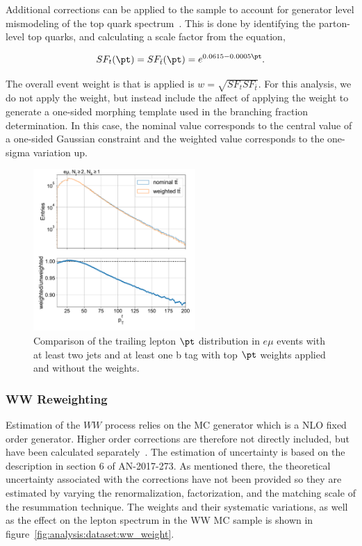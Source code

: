 Additional corrections can be applied to the \ttbar sample to account for generator level mismodeling of the top quark \pt spectrum~\cite{CMS-PAS-TOP-16-011, CMS-PAS-TOP-16-008}.  This is done by identifying the parton-level top quarks, and calculating a scale factor from the equation,

\begin{equation}
    \nonumber
    SF_{t}(\pt) = SF_{\bar{t}}(\pt) = e^{0.0615-0.0005 \pt}.
\end{equation}


The overall event weight is that is applied is $w = \sqrt{SF_{t}SF_{\bar{t}}}$.  For this analysis, we do not apply the weight, but instead include the affect of applying the weight to generate a one-sided morphing template used in the branching fraction determination.  In this case, the nominal value corresponds to the central value of a one-sided Gaussian constraint and the weighted value corresponds to the one-sigma variation up.

\begin{figure}[ht]
    \centering
    \includegraphics[width=0.55\textwidth]{chapters/Analysis/sectionDataset/figures/top_pt_weight}
    \caption{Comparison of the trailing lepton $\pt$ distribution in $e\mu$ events with at least two jets and at least one b tag with top $\pt$ weights applied and without the weights.}
    \label{fig:analysis:dataset:top_pt_weight}
\end{figure}


\subsubsection{WW \pt Reweighting}
Estimation of the $WW$ process relies on the \POWHEG MC generator which is a NLO fixed order generator. Higher order corrections are therefore not directly included, but have been calculated separately~\cite{Meade:2014fca, Jaiswal:2014yba, Grazzini:2015wpa}.  The estimation of uncertainty is based on the description in section 6 of AN-2017-273. As mentioned there, the theoretical uncertainty associated with the corrections have not been provided so they are estimated by varying the renormalization, factorization, and the matching scale of the \pt resummation technique. The weights and their systematic variations, as well as the effect on the lepton \pt spectrum in the WW MC sample is shown in figure~\ref{fig:analysis:dataset:ww_weight}.

